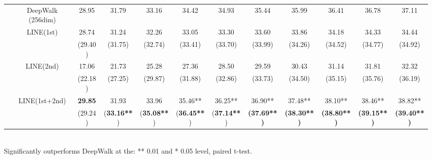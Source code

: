 \documentclass{sig-alternate-2013}
\begin{document}
\begin{table*}[!htdb]
{\begin{tabular}{|c|c|c|c|c|c|c|c|c|c|c|c|}
			&DeepWalk (256dim)& 28.95&	31.79&	33.16&	34.42&	34.93&	35.44&	35.99&	36.41&	36.78&	37.11  \\ \cline{2-12}
&\multirow{2}{*}{LINE(1st)} & 28.74&	31.24&	32.26&	33.05&	33.30&	33.60&	33.86&	34.18&	34.33&	34.44  \\ 
			& & (29.40)&	(31.75)&	(32.74)&	(33.41)&	(33.70)&	(33.99)&	(34.26)&	(34.52)&	(34.77)&	(34.92)  \\ \cline{2-12}
			&\multirow{2}{*}{LINE(2nd)} & 17.06&	21.73&	25.28&	27.36&	28.50&	29.59&	30.43&	31.14&	31.81&	32.32 \\ 
			& & (22.18)&	(27.25)&	(29.87)&	(31.88)&	(32.86)&	(33.73)&	(34.50)&	(35.15)&	(35.76)&	(36.19) \\ \cline{2-12}	
			&\multirow{2}{*}{LINE(1st+2nd)} & \textbf{29.85}&31.93&	33.96&35.46**&36.25**&36.90**&	37.48**&	38.10**&	38.46**&	38.82**  \\ 		
			& & (29.24)&(\textbf{33.16**})&(\textbf{35.08**})&(\textbf{36.45**})&(\textbf{37.14**})&\textbf{(37.69**)}&\textbf{(38.30**)}&\textbf{(38.80**)}&\textbf{(39.15**)}&\textbf{(39.40**)}  \\
			\hline
		\end{tabular}
	}
	\\	\scriptsize Significantly outperforms DeepWalk at the: ** 0.01 and * 0.05 level, paired t-test.	
\end{table*}
\end{document}
